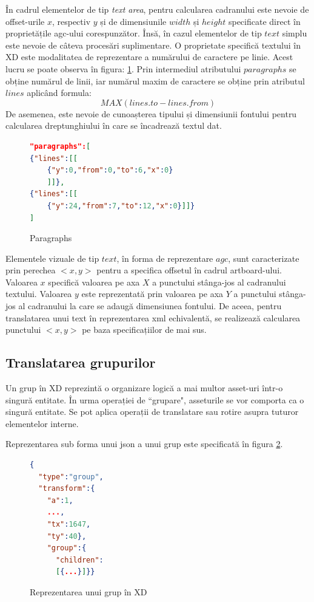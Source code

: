 În cadrul elementelor de tip \textit{text area}, pentru calcularea cadranului este nevoie de offset-urile $x$, respectiv $y$ și de dimensiunile $width$ și $height$ specificate direct în proprietățile agc-ului corespunzător. Însă, în cazul elementelor de tip $text$ simplu este nevoie de câteva procesări suplimentare.
O proprietate specifică textului în XD este modalitatea de reprezentare a numărului de caractere pe linie. Acest lucru se poate observa în figura: \ref{fig:Paragraphs}. Prin intermediul atributului $paragraphs$ se obține numărul de linii, iar numărul maxim de caractere se obține prin atributul $lines$ aplicând formula:  \[MAX(lines.to - lines.from)\] De asemenea, este nevoie de cunoașterea tipului și dimensiunii fontului pentru calcularea dreptunghiului în care se încadrează textul dat.

\begin{figure}[!htbp]
\begin{lstlisting}[language=json,firstnumber=1]
"paragraphs":[
{"lines":[[
    {"y":0,"from":0,"to":6,"x":0}
    ]]},
{"lines":[[
    {"y":24,"from":7,"to":12,"x":0}]]}
]
\end{lstlisting}
\caption{Paragraphs} \label{fig:Paragraphs}
\end{figure}

Elementele vizuale de tip $text$, în forma de reprezentare $agc$, sunt caracterizate prin perechea $<x, y>$ pentru a specifica offsetul în cadrul artboard-ului. Valoarea $x$ specifică valoarea pe axa $X$ a punctului stânga-jos al cadranului textului. Valoarea $y$ este reprezentată prin valoarea pe axa $Y$ a punctului stânga-jos al cadranului la care se adaugă dimensiunea fontului. De aceea, pentru translatarea unui text în reprezentarea xml echivalentă, se realizează calcularea punctului $<x, y>$ pe baza specificațiilor de mai sus.

\subsection{Translatarea grupurilor}

Un grup în XD reprezintă o organizare logică a mai multor asset-uri într-o singură entitate. În urma operației de ``grupare", asseturile se vor comporta ca o singură entitate. Se pot aplica operații de translatare sau rotire asupra tuturor elementelor interne. 

Reprezentarea sub forma unui json a unui grup este specificată în figura \ref{fig:Group}. 

\begin{figure}[!htbp]
\begin{lstlisting}[language=json,firstnumber=1]
{
  "type":"group",
  "transform":{
    "a":1,
    ...,
    "tx":1647,
    "ty":40},
    "group":{
      "children":
      [{...}]}}
\end{lstlisting}
\caption{Reprezentarea unui grup în XD} \label{fig:Group}
\end{figure}

